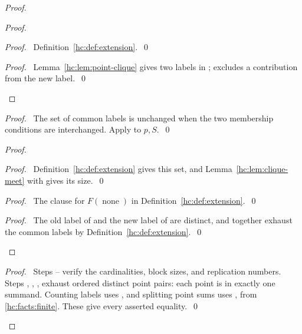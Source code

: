 \begin{mergedproofsection}
\begin{proof}
\begin{proof}
  \begin{proof}\pf\ Definition~\ref{hc:def:extension}.~\qed\end{proof}
  \qedstep
  \begin{proof}\pf\ Lemma~\ref{hc:lem:point-clique} gives two labels
   in ;  excludes
   a contribution from the new label.~\qed\end{proof}
 \end{proof}
 \begin{proof}\pf\ The set of common labels is unchanged when the
  two membership conditions are interchanged. Apply
   to $p,S$.~\qed\end{proof}
 \begin{proof}
  \begin{proof}\pf\ Definition~\ref{hc:def:extension} gives this
   set, and Lemma~\ref{hc:lem:clique-meet} with  gives its size.~\qed\end{proof}
  \begin{proof}\pf\ The clause for $F(\operatorname{none})$ in
   Definition~\ref{hc:def:extension}.~\qed\end{proof}
  \qedstep
  \begin{proof}\pf\ The old label of 
   and the new label of  are distinct,
   and together exhaust the common labels by
   Definition~\ref{hc:def:extension}.~\qed\end{proof}
 \end{proof}
 \qedstep
 \begin{proof}\pf\ Steps --
  verify the cardinalities, block sizes, and replication numbers.
  Steps , ,
  ,  exhaust ordered
  distinct point pairs: each point is in exactly one summand.
  Counting labels uses , and splitting
  point sums uses , from
  \ref{hc:facts:finite}. These give every asserted equality.~\qed\end{proof}
\end{proof}


\end{mergedproofsection}
